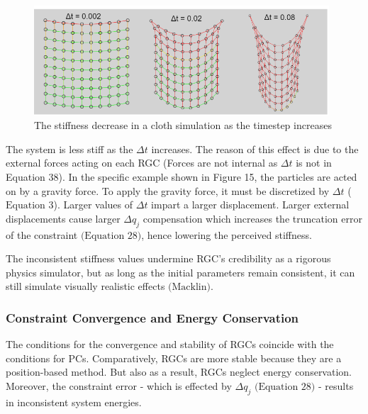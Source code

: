 \documentclass[12pt, letterpaper]{article}
\begin{document}
\begin{figure}[H]
\centering
\includegraphics[width=11cm]{rgc timestep.png}
\caption{The stiffness decrease in a cloth simulation as the timestep increases}
\label{fig:figure}
\end{figure} 
\noindent The system is less stiff as the $\Delta t$ increases. The reason of this effect is due to the external forces acting on each RGC (Forces are not internal as $\Delta t$ is not in Equation 38). In the specific example shown in Figure 15, the particles are acted on by a gravity force. To apply the gravity force, it must be discretized by $\Delta t$ ($\text{Equation 3}$). Larger values of $\Delta t$ impart a larger displacement. Larger external displacements cause larger $\Delta q_j$ compensation which increases the truncation error of the constraint $\text{(Equation 28)}$, hence lowering the perceived stiffness.

The inconsistent stiffness values undermine RGC's credibility as a rigorous physics simulator, but as long as the initial parameters remain consistent, it can still simulate visually realistic effects $\text{(Macklin)}$.

\subsubsection{Constraint Convergence and Energy Conservation}
 \hspace{\parindent} The conditions for the convergence and stability of RGCs coincide with the conditions for PCs. Comparatively, RGCs are more stable because they are a position-based method. But also as a result, RGCs neglect energy conservation. Moreover, the constraint error - which is effected by $\Delta q_j$ $\text{(Equation 28)}$ -  results in inconsistent system energies.
 
\end{document}
